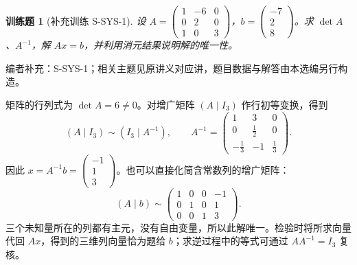 \documentclass[UTF8,12pt,a4paper,fontset=fandol]{ctexart}
\newtheorem{exercise}{训练题}[section]
\begin{document}
\begin{exercise}[补充训练 S-SYS-1]\label{prob:S-SYS-1}
设 $A=\begin{pmatrix}1&-6&0\\0&2&0\\1&0&3\end{pmatrix}$，$b=\begin{pmatrix}-7\\2\\8\end{pmatrix}$。求 $\det A$、$A^{-1}$，解 $Ax=b$，并利用消元结果说明解的唯一性。
\end{exercise}
\noindent 编者补充：S-SYS-1；相关主题见原讲义对应讲，题目数据与解答由本选编另行构造。
\begin{solve}
矩阵的行列式为 $\det A=6\ne0$。对增广矩阵 $(A\mid I_3)$ 作行初等变换，得到
\[(A\mid I_3)\sim(I_3\mid A^{-1}),\qquad A^{-1}=\begin{pmatrix}1&3&0\\0&\frac{1}{2}&0\\-\frac{1}{3}&-1&\frac{1}{3}\end{pmatrix}.\]
因此 $x=A^{-1}b=\begin{pmatrix}-1\\1\\3\end{pmatrix}$。也可以直接化简含常数列的增广矩阵：
\[(A\mid b)\sim \begin{pmatrix}1&0&0&-1\\0&1&0&1\\0&0&1&3\end{pmatrix}.\]
三个未知量所在的列都有主元，没有自由变量，所以此解唯一。检验时将所求向量代回 $Ax$，得到的三维列向量恰为题给 $b$；求逆过程中的等式可通过 $AA^{-1}=I_3$ 复核。
\end{solve}
\end{document}
